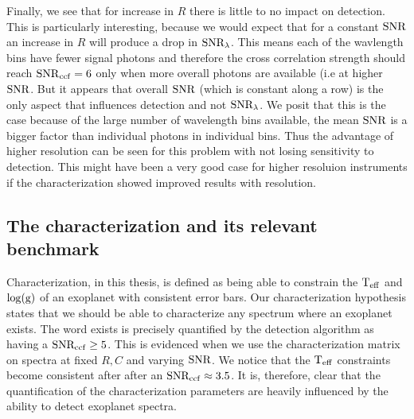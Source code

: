 Finally, we see that for increase in $R$ there is little to no impact on detection. 
This is particularly interesting, because we would expect that for a constant $\rm{SNR}$ an increase in $R$ will produce a drop in $\rm{SNR_{\lambda}}$. 
This means each of the wavlength bins have fewer signal photons and therefore the cross correlation strength should reach $\rm{SNR}_{ccf}=6$ only when more overall photons are available (i.e at higher $\rm{SNR}$. 
But it appears that overall $\rm{SNR}$ (which is constant along a row) is the only aspect that influences detection and not $\rm{SNR_{\lambda}}$.
We posit that this is the case because of the large number of wavelength bins available, the mean $\rm{SNR}$ is a bigger factor than individual photons in individual bins.
Thus the advantage of higher resolution can be seen for this problem with not losing sensitivity to detection.
This might have been a very good case for higher resoluion instruments if the characterization showed improved results with resolution.
\subsection{The characterization and its relevant benchmark}
\label{sec:removal of stellar}
Characterization, in this thesis, is defined as being able to constrain the $\rm{T_{eff}}$ and $\log(\rm{g})$ of an exoplanet with consistent error bars.
Our characterization hypothesis states that we should be able to characterize any spectrum where an exoplanet exists.
The word exists is precisely quantified by the detection algorithm as having a $\rm{SNR_{ccf}}\ge 5$.
This is evidenced when we use the characterization matrix on spectra at fixed $R,C$ and varying $\rm{SNR}$.
We notice that the $\rm{T_{eff}}$ constraints become consistent after after an $\rm{SNR_{ccf}}\approx 3.5$.
It is, therefore, clear that the quantification of the characterization parameters are heavily influenced by the ability to detect exoplanet spectra. 

